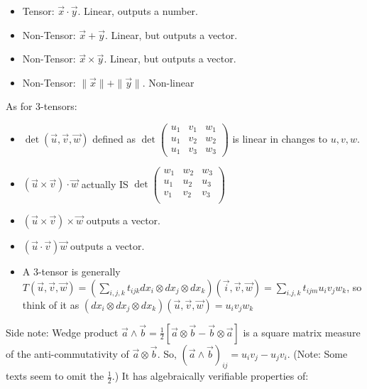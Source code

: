 \documentclass[11pt, oneside]{article}   	%
\begin{document}
\begin{itemize}
\item Tensor: $\vec{x} \cdot \vec{y}$.  Linear, outputs a number.
\item Non-Tensor: $\vec{x} + \vec{y}$.  Linear, but outputs a vector.
\item Non-Tensor: $\vec{x} \times \vec{y}$.  Linear, but outputs a vector.
\item Non-Tensor: $\|\vec{x}\| + \| \vec{y}\|$. Non-linear
\end{itemize}

As for 3-tensors:
\begin{itemize}
\item $\det(\vec{u}, \vec{v}, \vec{w})$ defined as $\det\begin{pmatrix}
u_1 & v_1 & w_1 \\
u_1 & v_2 & w_2 \\
u_1 & v_3 & w_3
\end{pmatrix}$ is linear in changes to $u, v, w$.
\item $(\vec{u} \times \vec{v})\cdot \vec{w}$ actually IS  $\det\begin{pmatrix}
w_1 & w_2 & w_3 \\
u_1 & u_2 & u_3 \\
v_1 & v_2 & v_3 \\
\end{pmatrix}$ 
\item $(\vec{u} \times \vec{v}) \times \vec{w}$ outputs a vector.
\item $(\vec{u} \cdot \vec{v})\vec{w}$ outputs a vector.
\item A 3-tensor is generally $T(\vec{u}, \vec{v}, \vec{w}) = (\sum_{i,j,k} t_{ijk}dx_i \otimes dx_j \otimes dx_k)(\vec{i}, \vec{v}, \vec{w}) = \sum_{i.j,k}t_{ijm}u_iv_jw_k$, so think of it as $(dx_i \otimes dx_j \otimes dx_k)(\vec{u}, \vec{v}, \vec{w}) = u_iv_jw_k$
\end{itemize}

Side note: Wedge product $\vec{a} \wedge \vec{b} =\frac{1}{2}[ \vec{a} \otimes \vec{b} - \vec{b} \otimes \vec{a}]$ is a square matrix measure of the anti-commutativity of $\vec{a} \otimes \vec{b}$.  So, $(\vec{a} \wedge \vec{b})_{ij} = u_iv_j - u_jv_i$. (Note: Some texts seem to omit the $\frac{1}{2}$.) It has algebraically verifiable properties of:
\end{document}
